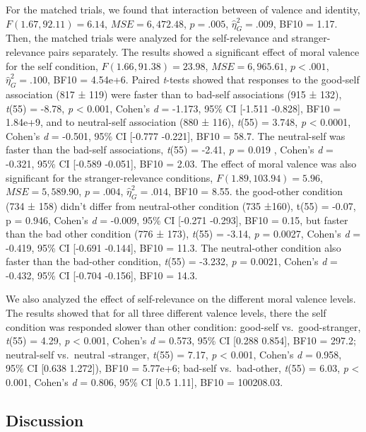 \documentclass[man]{apa6}
\begin{document}
For the matched trials, we found that interaction between of valence and identity, \(F(1.67, 92.11) = 6.14\), \(\mathit{MSE} = 6,472.48\), \(p = .005\), \(\hat{\eta}^2_G = .009\), BF10 = 1.17. Then, the matched trials were analyzed for the self-relevance and stranger-relevance pairs separately. The results showed a significant effect of moral valence for the self condition, \(F(1.66, 91.38) = 23.98\), \(\mathit{MSE} = 6,965.61\), \(p < .001\), \(\hat{\eta}^2_G = .100\), BF10 = 4.54e+6. Paired \emph{t}-tests showed that responses to the good-self association (817 ± 119) were faster than to bad-self associations (915 ± 132), \emph{t}(55) = -8.78, \emph{p} \textless{} 0.001, Cohen's \emph{d} = -1.173, 95\% CI {[}-1.511 -0.828{]}, BF10 = 1.84e+9, and to neutral-self association (880 ± 116), \emph{t}(55) = 3.748, \emph{p} \textless{} 0.0001, Cohen's \emph{d} = -0.501, 95\% CI {[}-0.777 -0.221{]}, BF10 = 58.7. The neutral-self was faster than the bad-self associations, \emph{t}(55) = -2.41, \emph{p} = 0.019 , Cohen's \emph{d} = -0.321, 95\% CI {[}-0.589 -0.051{]}, BF10 = 2.03.
The effect of moral valence was also significant for the stranger-relevance conditions, \(F(1.89, 103.94) = 5.96\), \(\mathit{MSE} = 5,589.90\), \(p = .004\), \(\hat{\eta}^2_G = .014\), BF10 = 8.55. the good-other condition (734 ± 158) didn't differ from neutral-other condition (735 ±160), t(55) = -0.07, p = 0.946, Cohen's \emph{d} = -0.009, 95\% CI {[}-0.271 -0.293{]}, BF10 = 0.15, but faster than the bad other condition (776 ± 173), \emph{t}(55) = -3.14, \emph{p} = 0.0027, Cohen's \emph{d} = -0.419, 95\% CI {[}-0.691 -0.144{]}, BF10 = 11.3. The neutral-other condition also faster than the bad-other condition, \emph{t}(55) = -3.232, \emph{p} = 0.0021, Cohen's \emph{d} = -0.432, 95\% CI {[}-0.704 -0.156{]}, BF10 = 14.3.

We also analyzed the effect of self-relevance on the different moral valence levels. The results showed that for all three different valence levels, there the self condition was responded slower than other condition: good-self vs.~good-stranger, \emph{t}(55) = 4.29, \emph{p} \textless{} 0.001, Cohen's \emph{d} = 0.573, 95\% CI {[}0.288 0.854{]}, BF10 = 297.2; neutral-self vs.~neutral -stranger, \emph{t}(55) = 7.17, \emph{p} \textless{} 0.001, Cohen's \emph{d} = 0.958, 95\% CI {[}0.638 1.272{]}), BF10 = 5.77e+6; bad-self vs.~bad-other, \emph{t}(55) = 6.03, \emph{p} \textless{} 0.001, Cohen's \emph{d} = 0.806, 95\% CI {[}0.5 1.11{]}, BF10 = 100208.03.

\hypertarget{discussion-3}{%
\subsection{Discussion}\label{discussion-3}}
\end{document}
